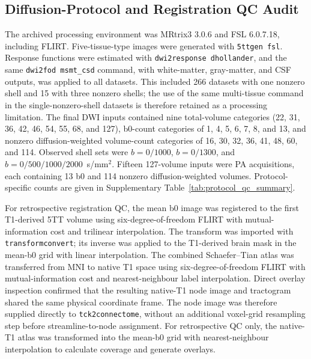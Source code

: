 \documentclass{article}
\begin{document}
\subsection{Diffusion-Protocol and Registration QC Audit}
\begin{sloppypar}
The archived processing environment was MRtrix3 3.0.6 and FSL 6.0.7.18, including FLIRT. Five-tissue-type images were generated with \texttt{5ttgen fsl}. Response functions were estimated with \texttt{dwi2response dhollander}, and the same \texttt{dwi2fod msmt\_csd} command, with white-matter, gray-matter, and CSF outputs, was applied to all datasets. This included 266 datasets with one nonzero shell and 15 with three nonzero shells; the use of the same multi-tissue command in the single-nonzero-shell datasets is therefore retained as a processing limitation. The final DWI inputs contained nine total-volume categories (22, 31, 36, 42, 46, 54, 55, 68, and 127), b0-count categories of 1, 4, 5, 6, 7, 8, and 13, and nonzero diffusion-weighted volume-count categories of 16, 30, 32, 36, 41, 48, 60, and 114. Observed shell sets were $b=0/1000$, $b=0/1300$, and $b=0/500/1000/2000$~s/mm$^{2}$. Fifteen 127-volume inputs were PA acquisitions, each containing 13 b0 and 114 nonzero diffusion-weighted volumes. Protocol-specific counts are given in Supplementary Table~\ref{tab:protocol_qc_summary}.
\end{sloppypar}

For retrospective registration QC, the mean b0 image was registered to the first T1-derived 5TT volume using six-degree-of-freedom FLIRT with mutual-information cost and trilinear interpolation. The transform was imported with \texttt{transformconvert}; its inverse was applied to the T1-derived brain mask in the mean-b0 grid with linear interpolation. The combined Schaefer--Tian atlas was transferred from MNI to native T1 space using six-degree-of-freedom FLIRT with mutual-information cost and nearest-neighbour label interpolation. Direct overlay inspection confirmed that the resulting native-T1 node image and tractogram shared the same physical coordinate frame. The node image was therefore supplied directly to \texttt{tck2connectome}, without an additional voxel-grid resampling step before streamline-to-node assignment. For retrospective QC only, the native-T1 atlas was transformed into the mean-b0 grid with nearest-neighbour interpolation to calculate coverage and generate overlays.
\end{document}
